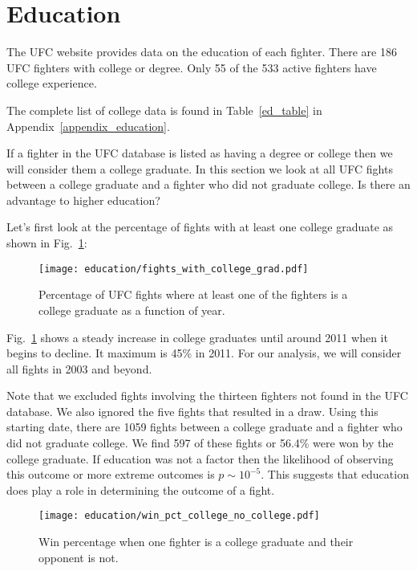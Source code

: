 \clearpage
\section{Education}

The UFC website provides data on the education of each fighter.
There are 186 UFC fighters with college or degree. Only 55
of the 533 active fighters have college experience.

The complete list of college data is found in Table~\ref{ed_table}
in Appendix~\ref{appendix_education}.

If a fighter in the UFC database is listed as having a degree
or college then we will consider them a college graduate. In
this section we look at all UFC fights between a college graduate
and a fighter who did not graduate college. Is there an advantage
to higher education?

Let's first look at the percentage of fights with at least
one college graduate as shown in Fig.~\ref{fights_with_college_grad}:

\begin{figure}[h]
\begin{center}
\texttt{[image: education/fights\_with\_college\_grad.pdf]}
\caption{Percentage of UFC fights where at least one of the fighters
is a college graduate as a function of year.}
\label{fights_with_college_grad}
\end{center}
\end{figure}

Fig.~\ref{fights_with_college_grad} shows a steady increase in
college graduates until around 2011 when it begins to decline.
It maximum is 45\% in 2011. For our analysis, we will consider
all fights in 2003 and beyond.

Note that we excluded fights involving the thirteen fighters
not found in the UFC database. We also ignored the five fights that resulted
in a draw.
Using this starting date, there are 1059 fights between a college
graduate and a fighter who did not graduate college. We find
597 of these fights or 56.4\% were won by the college graduate.
If education was not a factor then the likelihood of observing
this outcome or more extreme outcomes is $p\sim10^{-5}$. This
suggests that education does play a role in determining the outcome
of a fight.

\begin{figure}[h]
\begin{center}
\texttt{[image: education/win\_pct\_college\_no\_college.pdf]}
\caption{Win percentage when one fighter is a college graduate and their
opponent is not.}
\label{win_pct_college_no_college}
\end{center}
\end{figure}

